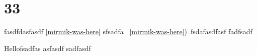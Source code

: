 
\section*{33}
fasdfdasfasdf \ref{mirmik-was-here} sfsadfa ~\ref{mirmik-was-here})~fsdafasdfasf 
\pageref{mirmik-was-here} fadfsadf

Hellofsadfas
asfasdf
sadfasdf